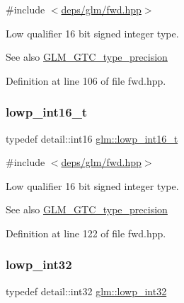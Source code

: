 {\ttfamily \#include $<$\hyperlink{fwd_8hpp}{deps/glm/fwd.\+hpp}$>$}

Low qualifier 16 bit signed integer type. \begin{DoxySeeAlso}{See also}
\hyperlink{group__gtc__type__precision}{G\+L\+M\+\_\+\+G\+T\+C\+\_\+type\+\_\+precision} 
\end{DoxySeeAlso}


Definition at line 106 of file fwd.\+hpp.

\mbox{\label{group__gtc__type__precision_gae34c3d53c4c1434fc9f26538b0185667}} 
\subsubsection{\texorpdfstring{lowp\+\_\+int16\+\_\+t}{lowp\_int16\_t}}
{\footnotesize\ttfamily typedef detail\+::int16 \hyperlink{group__gtc__type__precision_gae34c3d53c4c1434fc9f26538b0185667}{glm\+::lowp\+\_\+int16\+\_\+t}}



{\ttfamily \#include $<$\hyperlink{fwd_8hpp}{deps/glm/fwd.\+hpp}$>$}

Low qualifier 16 bit signed integer type. \begin{DoxySeeAlso}{See also}
\hyperlink{group__gtc__type__precision}{G\+L\+M\+\_\+\+G\+T\+C\+\_\+type\+\_\+precision} 
\end{DoxySeeAlso}


Definition at line 122 of file fwd.\+hpp.

\mbox{\label{group__gtc__type__precision_gad9939c9d6fec1c6accc02a83c6500f08}} 
\subsubsection{\texorpdfstring{lowp\+\_\+int32}{lowp\_int32}}
{\footnotesize\ttfamily typedef detail\+::int32 \hyperlink{group__gtc__type__precision_gad9939c9d6fec1c6accc02a83c6500f08}{glm\+::lowp\+\_\+int32}}



